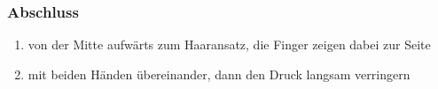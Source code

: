 \subsubsection{Abschluss}
\begin{enumerate}
  \item {} von der Mitte aufwärts zum Haaransatz, die Finger zeigen dabei zur Seite
  \item {} mit beiden Händen übereinander, dann den Druck langsam verringern
\end{enumerate}
